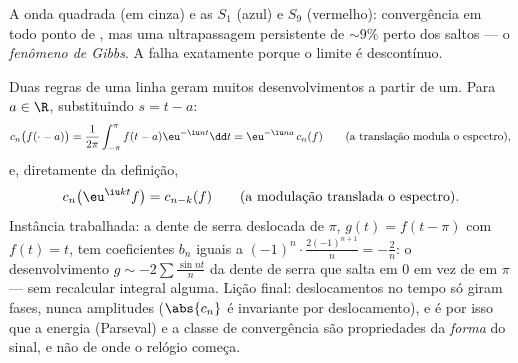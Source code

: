 \begin{omfigure}

{\small A onda quadrada (em cinza) e as  $S_1$
(azul) e $S_9$ (vermelho): convergência em todo ponto de , mas
uma ultrapassagem persistente de $\sim 9\%$ perto dos saltos --- o
\emph{fenômeno de Gibbs}. A  falha exatamente porque o limite é descontínuo.}
\end{omfigure}

\begin{example}\label{ex:b2:fourier:shiftrules}
Duas regras de uma linha geram muitos desenvolvimentos a partir de um. Para $a
\in \R$, substituindo $s = t - a$:
\[
c_n\bigl(f(\cdot - a)\bigr)
= \frac{1}{2\pi}\int_{-\pi}^{\pi}f(t - a)\eu^{-\iu nt}\dd t
= \eu^{-\iu na}\,c_n(f)
\qquad\text{(a translação modula o espectro)},
\]
e, diretamente da definição,
\[
c_n\bigl(\eu^{\iu kt}f\bigr) = c_{n-k}(f)
\qquad\text{(a modulação translada o espectro)}.
\]
Instância trabalhada: a dente de serra deslocada de $\pi$, $g(t) = f(t -
\pi)$ com $f(t) = t$, tem coeficientes
$b_n$ iguais a $(-1)^n\cdot\frac{2(-1)^{n+1}}{n} = -\frac2n$: o desenvolvimento
$g \sim -2\sum\frac{\sin nt}{n}$ da dente de serra que salta em
$0$ em vez de em $\pi$ --- sem recalcular integral alguma. Lição
final: deslocamentos no tempo só giram fases, nunca amplitudes
($\abs{c_n}$ é invariante por deslocamento), e é por isso que a energia
(Parseval) e a classe de convergência são propriedades da \emph{forma}
do sinal, e não de onde o relógio começa.
\end{example}

